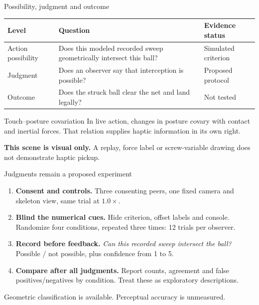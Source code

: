 \begin{frame}{Possibility, judgment and outcome}
\small
\begin{tabularx}{\textwidth}{@{}p{2.1cm}Yp{3.2cm}@{}}\toprule
Level & Question & Evidence status\\\midrule
Action possibility & Does this modeled recorded sweep geometrically intersect this ball? & Simulated criterion\\[5pt]
Judgment & Does an observer say that interception is possible? & Proposed protocol\\[5pt]
Outcome & Does the struck ball clear the net and land legally? & Not tested\\\bottomrule
\end{tabularx}\par
\par\bigskip
\begin{tbox}{Touch--posture covariation}
In live action, changes in posture covary with contact and inertial forces. That relation supplies haptic information in its own right.
\end{tbox}
\par\smallskip
\textbf{This scene is visual only.} A replay, force label or screw-variable drawing does not demonstrate haptic pickup.
\end{frame}

\begin{frame}{Judgments remain a proposed experiment}
\begin{enumerate}
\item \textbf{Consent and controls.} Three consenting peers, one fixed camera and skeleton view, same trial at $1.0\times$.
\item \textbf{Blind the numerical cues.} Hide criterion, offset labels and console. Randomize four conditions, repeated three times: 12 trials per observer.
\item \textbf{Record before feedback.} \emph{Can this recorded sweep intersect the ball?} Possible / not possible, plus confidence from 1 to 5.
\item \textbf{Compare after all judgments.} Report counts, agreement and false positives/negatives by condition. Treat these as exploratory descriptions.
\end{enumerate}
\par\medskip
\begin{ibox}Geometric classification is available. Perceptual accuracy is unmeasured.\end{ibox}
\end{frame}

